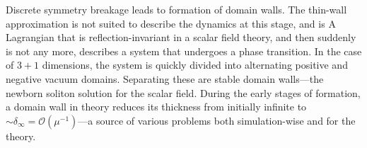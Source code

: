 



\newcommand{\lcoord}{\ALIASlcoord} %
\newcommand{\lcoordx}{\ALIASlcoordx} %
\newcommand{\lcoordk}{\ALIASlcoordk} %
\newcommand*\Ft{\ALIASFt}
\newcommand\dummy{\ALIASdummy}
\newcommand*\Tw{\ALIASTw}
\newcommand*\Twf{\ALIASTwf}












Discrete symmetry breakage leads to formation of domain walls. The thin-wall approximation is not suited to describe the dynamics at this stage, and is  A Lagrangian that is reflection-invariant in a scalar field theory, and then suddenly is not any more, describes a system that undergoes a phase transition. In the case of $3+1$ dimensions, the system is quickly divided into alternating positive and negative vacuum domains. Separating these are stable domain walls---the newborn soliton solution for the scalar field. During the early stages of formation, a domain wall in theory reduces its thickness from initially infinite to $\sim \delta_\infty = \mathscr{O}(\mu^{-1})$---a source of various problems both simulation-wise and for the theory. 





